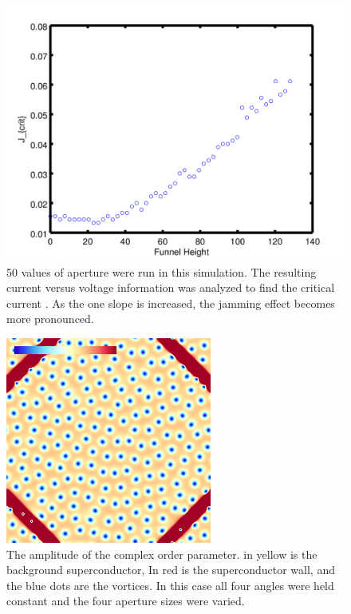 \begin{figure}[htbp]
\begin{center}
\includegraphics[scale=.50]{oneSideY.png}
\caption{ 50 values of aperture were run in this simulation. The resulting current versus voltage information was analyzed to find the critical current . As the one slope is increased, the jamming effect becomes more pronounced. }
\label{oneYscan}
\end{center}
\end{figure}

\begin{figure}[htbp]
\begin{center}
\includegraphics[scale=.50]{emptyDiamond.png}
\caption{ The amplitude of the complex order parameter. in yellow is the background superconductor, In red is the superconductor wall, and the blue dots are the vortices. In this case all four angles were held constant and the four aperture sizes were varied.}
\label{emptyDiamond}
\end{center}
\end{figure}

